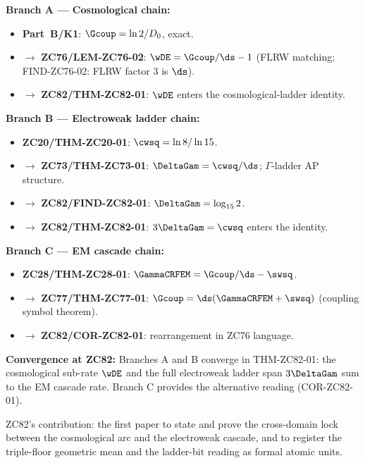 \documentclass[12pt, a4paper]{article}
\begin{document}
\begin{genealogybox}[title={How ZC82's Key Objects Trace Back}]

\textbf{Branch A --- Cosmological chain:}
\begin{itemize}[leftmargin=2em, noitemsep]
  \item \textbf{Part~B/K1}: $\Gcoup = \ln2/D_0$, exact.
  \item $\to$ \textbf{ZC76/LEM-ZC76-02}: $\wDE = \Gcoup/\ds - 1$
    (FLRW matching; FIND-ZC76-02: FLRW factor $3$ is $\ds$).
  \item $\to$ \textbf{ZC82/THM-ZC82-01}: $\wDE$ enters
    the cosmological-ladder identity.
\end{itemize}

\textbf{Branch B --- Electroweak ladder chain:}
\begin{itemize}[leftmargin=2em, noitemsep]
  \item \textbf{ZC20/THM-ZC20-01}: $\cwsq = \ln8/\ln15$.
  \item $\to$ \textbf{ZC73/THM-ZC73-01}: $\DeltaGam = \cwsq/\ds$;
    $\Gamma$-ladder AP structure.
  \item $\to$ \textbf{ZC82/FIND-ZC82-01}: $\DeltaGam = \log_{15}2$.
  \item $\to$ \textbf{ZC82/THM-ZC82-01}: $3\DeltaGam = \cwsq$
    enters the identity.
\end{itemize}

\textbf{Branch C --- EM cascade chain:}
\begin{itemize}[leftmargin=2em, noitemsep]
  \item \textbf{ZC28/THM-ZC28-01}: $\GammaCRFEM
    = \Gcoup/\ds - \swsq$.
  \item $\to$ \textbf{ZC77/THM-ZC77-01}: $\Gcoup
    = \ds(\GammaCRFEM + \swsq)$ (coupling symbol theorem).
  \item $\to$ \textbf{ZC82/COR-ZC82-01}: rearrangement
    in ZC76 language.
\end{itemize}

\textbf{Convergence at ZC82:}
Branches A and B converge in THM-ZC82-01: the cosmological
sub-rate $\wDE$ and the full electroweak ladder span
$3\DeltaGam$ sum to the EM cascade rate.
Branch C provides the alternative reading (COR-ZC82-01).

ZC82's contribution: the first paper to state and prove
the cross-domain lock between the cosmological arc and
the electroweak cascade, and to register the triple-floor
geometric mean and the ladder-bit reading as formal atomic units.
\end{genealogybox}
\end{document}
